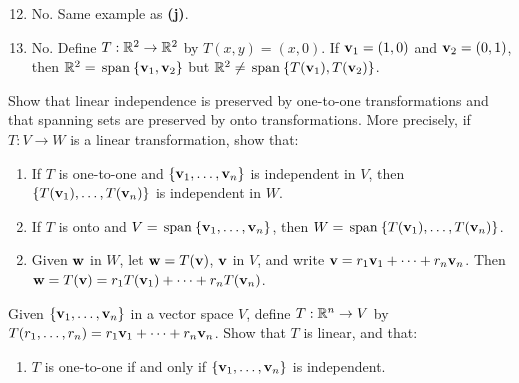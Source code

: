 \begin{multicols}{2}
\begin{ex}
\begin{sol}
\begin{enumerate}[label={\alph*.}]
\setcounter{enumi}{11}
\item  No. Same example as \textbf{(j)}.

\setcounter{enumi}{13}
\item  No. Define $T : \mathbb{R}^2 \to \mathbb{R}^2$ by $T(x, y) = (x, 0)$. If $\textbf{v}_{1} = (1, 0)$ and $\textbf{v}_{2} = (0, 1)$, then $\mathbb{R}^2 = \thinspace\operatorname{span\medspace}\{\textbf{v}_{1}, \textbf{v}_{2}\}$ but $\mathbb{R}^2 \neq \thinspace\operatorname{span\medspace}\{T(\textbf{v}_{1}), T(\textbf{v}_{2})\}$.

\end{enumerate}
\end{sol}
\end{ex}

\begin{ex}
Show that linear independence is preserved by one-to-one transformations and that spanning sets are preserved by onto transformations. More precisely, if $T : V \to W$ is a linear transformation, show that:


\begin{enumerate}[label={\alph*.}]
\item If $T$ is one-to-one and $\{\textbf{v}_{1}, \dots, \textbf{v}_{n}\}$ is independent in $V$, then $\{T(\textbf{v}_{1}), \dots, T(\textbf{v}_{n})\}$ is independent in $W$.

\item If $T$ is onto and $V = \thinspace\operatorname{span\medspace}\{\textbf{v}_{1}, \dots, \textbf{v}_{n}\}$, then $W = \thinspace\operatorname{span\medspace}\{T(\textbf{v}_{1}), \dots, T(\textbf{v}_{n})\}$.

\end{enumerate}
\begin{sol}
\begin{enumerate}[label={\alph*.}]
\setcounter{enumi}{1}
\item  Given $\textbf{w}$ in $W$, let $\textbf{w} = T(\textbf{v})$, $\textbf{v}$ in $V$, and write $\textbf{v} = r_{1}\textbf{v}_{1} + \cdots + r_{n}\textbf{v}_{n}$. Then $\textbf{w} = T(\textbf{v}) = r_{1}T(\textbf{v}_{1}) + \cdots + r_{n}T(\textbf{v}_{n})$.

\end{enumerate}
\end{sol}
\end{ex}

\begin{ex}
Given $\{\textbf{v}_{1}, \dots, \textbf{v}_{n}\}$ in a vector space $V$, define $T : \mathbb{R}^n \to V$ by $T(r_{1}, \dots, r_{n}) = r_{1}\textbf{v}_{1} + \cdots + r_{n}\textbf{v}_{n}$. Show that $T$ is linear, and that:


\begin{enumerate}[label={\alph*.}]
\item $T$ is one-to-one if and only if $\{\textbf{v}_{1}, \dots, \textbf{v}_{n}\}$ is independent.


\end{enumerate}
\end{ex}
\end{multicols}
